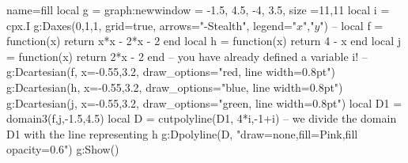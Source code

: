 \documentclass[12pt]{standalone}
\begin{document}
\begin{luadraw}{name=fill}
local g = graph:new{window = {-1.5, 4.5, -4, 3.5}, size ={11,11}}
local i = cpx.I 
g:Daxes({0,1,1}, {grid=true, arrows="-Stealth", legend={"$x$","$y$"}})
--
local f = function(x) return x*x - 2*x - 2 end
local h = function(x) return 4 - x end
local j = function(x) return 2*x - 2 end -- you have already defined a variable i!
--
g:Dcartesian(f, {x={-0.55,3.2}, draw_options="red, line width=0.8pt"})
g:Dcartesian(h, {x={-0.55,3.2}, draw_options="blue, line width=0.8pt"})
g:Dcartesian(j, {x={-0.55,3.2}, draw_options="green, line width=0.8pt"})
local D1 = domain3(f,j,-1.5,4.5)
local D = cutpolyline(D1, {4*i,-1+i}) -- we divide the domain D1 with the line representing h
g:Dpolyline(D, "draw=none,fill=Pink,fill opacity=0.6")
g:Show()
\end{luadraw}
\end{document}
